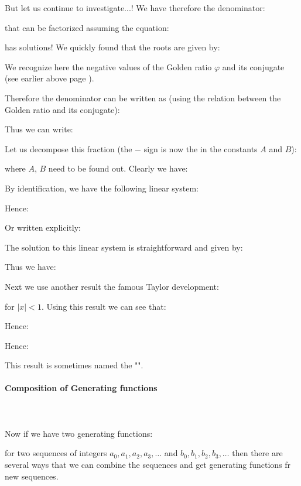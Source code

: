 	But let us continue to investigate...! We have therefore the denominator:
	
	that can be factorized assuming the equation:
	
	has solutions! We quickly found that the roots are given by:
	
	We recognize here the negative values of the Golden ratio $\varphi$ and its conjugate (see earlier above page \pageref{golden ratio}).
	
	Therefore the denominator can be written as (using the relation between the Golden ratio and its conjugate):
	
	Thus we can write:
	
	Let us decompose this fraction (the $-$ sign is now the in the constants $A$ and $B$):
	
	where $A$, $B$ need to be found out. Clearly we have:
	
	By identification, we have the following linear system:
	
	Hence:
	
	Or written explicitly:
	
	The solution to this linear system is straightforward and given by:
	
	Thus we have:
	
	Next we use another result the famous Taylor development:
	
	for $|x|<1$. Using this result we can see that:
	
	Hence:
	
	Hence:
	
	This result is sometimes named the "".
		
	\paragraph{Composition of Generating functions}\mbox{}\\\\
	Now if we have two generating functions:
	
	for two sequences of integers $a_0,a_1,a_2,a_3,\ldots$ and $b_0,b_1,b_2,b_3,\ldots$ then there are several ways that we can combine the sequences and get generating functions fr new sequences.

